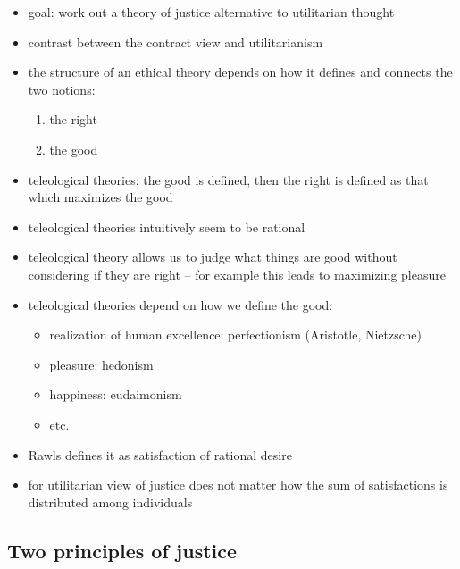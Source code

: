 \begin{itemize}
	\item goal: work out a theory of justice alternative to utilitarian
	thought
	\item contrast between the contract view and utilitarianism
	\item the structure of an ethical theory depends on how it defines
	and connects the two notions:
	\begin{enumerate}
		\item the right
		\item the good
	\end{enumerate}
	\item teleological theories: the good is defined, then the right is
	defined as that which maximizes the good
	\item teleological theories intuitively seem to be rational
	\item teleological theory allows us to judge what things are good
	without considering if they are right -- for example this leads to
	maximizing pleasure
	\item teleological theories depend on how we define the good:
	\begin{itemize}
		\item realization of human excellence: perfectionism
		(Aristotle, Nietzsche)
		\item pleasure: hedonism
		\item happiness: eudaimonism
		\item etc.
	\end{itemize}
	\item Rawls defines it as satisfaction of rational desire
	\item for utilitarian view of justice does not matter how the sum of
	satisfactions is distributed among individuals
\end{itemize}

\subsection{Two principles of justice}

